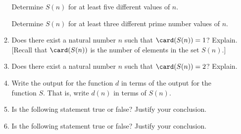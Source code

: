 \begin{enumerate}
\begin{enumerate}
\yitem Determine  $S( n )$  for at least five different values of  $n$.

\yitem Determine  $S( n )$  for at least three different prime number values of  $n$.

\item Does there exist a natural number  $n$  such that  
$\card (S(n)) = 1$?  Explain.  [Recall that  $\card (S(n))$ is the number of elements in the set  
$S( n )$.]

\item Does there exist a natural number  $n$  such that  $\card (S(n)) = 2$?  Explain.

\item Write the output for the function  $d$  in terms of the output for the function  $S$.  That is, write  $d( n )$  in terms of  $S( n )$.

\item Is the following statement true or false?  Justify your conclusion.

\item Is the following statement true or false?  Justify your conclusion.
\end{enumerate}

\end{enumerate}

